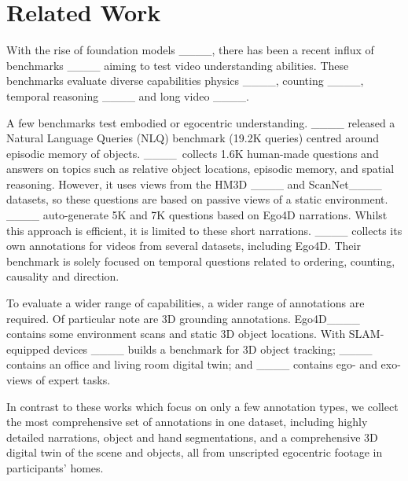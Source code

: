 \section{Related Work}
\vspace{-0.3em}

With the rise of foundation models ____, there has been a recent influx of %
benchmarks ____ aiming to test video understanding abilities. 
These benchmarks evaluate diverse  capabilities \eg physics ____, counting ____, temporal reasoning  ____ and long video ____.


A few benchmarks test embodied or egocentric understanding. 
____ released a Natural Language Queries (NLQ) benchmark (19.2K queries) centred around episodic memory of objects.
____~collects 1.6K human-made questions and answers on topics such as relative object locations, episodic memory, and spatial reasoning. However, it uses views from the HM3D ____ and ScanNet____ datasets, so these questions are based on passive views of a static environment. ____ auto-generate 5K and 7K questions based on Ego4D narrations. Whilst this approach is efficient, it is limited to these short narrations.
____ collects its own annotations for videos from several datasets, including Ego4D. %
Their benchmark is solely focused on temporal questions related to ordering, counting, causality and direction.


To evaluate a wider range of capabilities, a wider range of annotations are required. 
Of particular note are 3D grounding annotations.
Ego4D____ contains some environment scans and static 3D object locations. With SLAM-equipped devices ____ builds a benchmark for 3D object tracking; ____ contains an office and living room digital twin; and ____ contains ego- and exo- views of expert tasks.

In contrast to these works which focus on only a few annotation types, we collect the most comprehensive set of annotations in one dataset, including highly detailed narrations, object and hand segmentations, and a comprehensive 3D digital twin of the scene and objects, all from unscripted egocentric footage in participants' homes. 



\vspace{-0.5em}